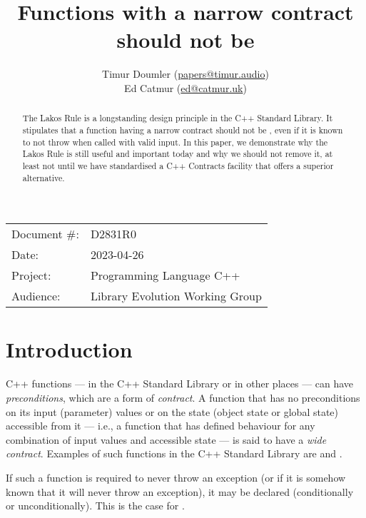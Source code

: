 


\title{Functions with a narrow contract should not be }
\author{ Timur Doumler \small(\href{mailto:papers@timur.audio}{papers@timur.audio})   \\
Ed Catmur \small(\href{mailto:papers@timur.audio}{ed@catmur.uk})  }
\date{}
\maketitle

\begin{tabular}{ll}
Document \#: & D2831R0 \\
Date: &2023-04-26 \\
Project: & Programming Language C++ \\
Audience: & Library Evolution Working Group
\end{tabular}

\begin{abstract}
The Lakos Rule is a longstanding design principle in the C++ Standard Library. It stipulates that a function having a narrow contract should not be , even if it is known to not throw when called with valid input. In this paper, we demonstrate why the Lakos Rule is still useful and important today and why we should not remove it, at least not until we have standardised a C++ Contracts facility that offers a superior alternative.
\end{abstract}

\section{Introduction}
\label{sec:intro}

C++ functions --- in the C++ Standard Library or in other places --- can have \emph{preconditions}, which are a form of \emph{contract}. A function that has no preconditions on its input (parameter) values or on the state (object state or global state) accessible from it --- i.e., a function that has defined behaviour for any combination of input values and accessible state --- is said to have a \emph{wide contract}. Examples of such functions in the C++ Standard Library are  and .

If such a function is required to never throw an exception (or if it is somehow known that it will never throw an exception), it may be declared  (conditionally or unconditionally). This is the case for .

